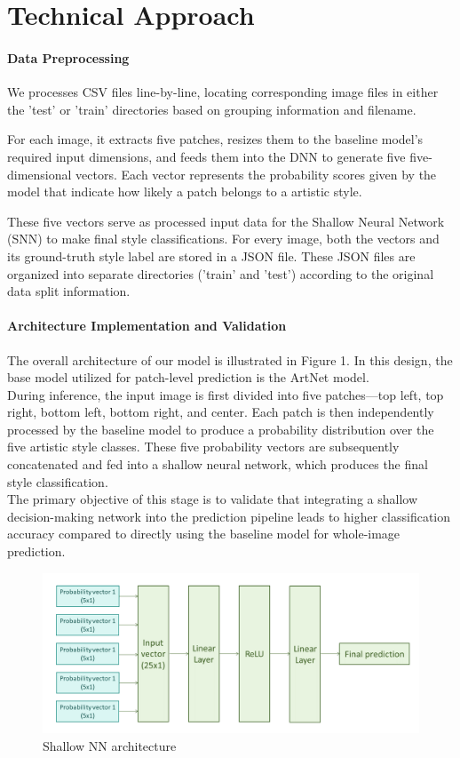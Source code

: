 \section{Technical Approach}
\label{sec:method}
\paragraph{Data Preprocessing}
We processes CSV files line-by-line, locating corresponding image files in
either the 'test' or 'train' directories based on grouping information and
filename.

For each image, it extracts five patches, resizes them to the baseline model's
required input dimensions, and feeds them into the DNN to generate five
five-dimensional vectors. Each vector represents the probability scores given
by the model that indicate how likely a patch belongs to a artistic style.

These five vectors serve as processed input data for the Shallow Neural Network
(SNN) to make final style classifications. For every image, both the vectors
and its ground-truth style label are stored in a JSON file. These JSON files
are organized into separate directories ('train' and 'test') according to the
original data split information.
\paragraph{Architecture Implementation and Validation}
The overall architecture of our model is illustrated in Figure 1. In this
design, the base model utilized for patch-level prediction is the ArtNet
model.\\ During inference, the input image is first divided into five
patches—top left, top right, bottom left, bottom right, and center. Each patch
is then independently processed by the baseline model to produce a probability
distribution over the five artistic style classes. These five probability
vectors are subsequently concatenated and fed into a shallow neural network,
which produces the final style classification.\\ The primary objective of this
stage is to validate that integrating a shallow decision-making network into
the prediction pipeline leads to higher classification accuracy compared to
directly using the baseline model for whole-image prediction.
\begin{figure}[h]

    \centering
    \includegraphics[width=.45\textwidth]{shallownn.png}
    \caption{Shallow NN architecture}
    \label{fig:main_pipeline}
\end{figure}

